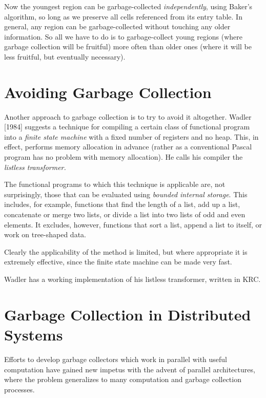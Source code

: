     Now the youngest region can be garbage-collected \textit{independently}, using
    Baker's algorithm, so long as we preserve all cells referenced from its entry
    table. In general, any region can be garbage-collected without touching any
    older information. So all we have to do is to garbage-collect young regions
    (where garbage collection will be fruitful) more often than older ones (where
    it will be less fruitful, but eventually necessary).

    \section{Avoiding Garbage Collection}

    Another approach to garbage collection is to try to avoid it altogether. Wadler
    [1984] suggests a technique for compiling a certain class of functional program
    into a \textit{finite state machine} with a fixed number of registers and no heap. This, in
    effect, performs memory allocation in advance (rather as a conventional
    Pascal program has no problem with memory allocation). He calls his
    compiler the \textit{listless transformer.}

    The functional programs to which this technique is applicable are, not
    surprisingly, those that can be evaluated using \textit{bounded internal storage}. This
    includes, for example, functions that find the length of a list, add up a list,
    concatenate or merge two lists, or divide a list into two lists of odd and even
    elements. It excludes, however, functions that sort a list, append a list to
    itself, or work on tree-shaped data.

    Clearly the applicability of the method is limited, but where appropriate it
    is extremely effective, since the finite state machine can be made very fast.

    Wadler has a working implementation of his listless transformer, written in
    KRC.

    \section{Garbage Collection in Distributed Systems}

    Efforts to develop garbage collectors which work in parallel with useful
    computation have gained new impetus with the advent of parallel architectures, where the problem generalizes to many computation and garbage
    collection processes.

